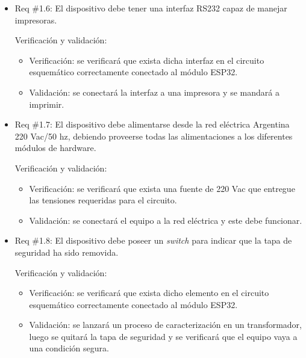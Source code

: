 \documentclass[11pt]{charter}
\begin{document}
\begin{itemize} 
\item Req \#1.6: El dispositivo debe tener una interfaz RS232 capaz de manejar impresoras.

Verificación y validación:

\begin{itemize}
\item Verificación: se verificará que exista dicha interfaz en el circuito esquemático correctamente conectado al módulo ESP32.
\item Validación: se conectará la interfaz a una impresora y se mandará a imprimir.
\end{itemize}

\end{itemize}

\begin{itemize} 
\item Req \#1.7: El dispositivo debe alimentarse desde la red eléctrica Argentina 220 Vac/50 hz, debiendo proveerse todas las alimentaciones a los diferentes módulos de hardware.

Verificación y validación:

\begin{itemize}
\item Verificación: se verificará que exista una fuente de 220 Vac que entregue las tensiones requeridas para el circuito.
\item Validación: se conectará el equipo a la red eléctrica y este debe funcionar. 
\end{itemize}

\end{itemize}

\begin{itemize} 
\item Req \#1.8: El dispositivo debe poseer un \textit{switch} para indicar que la tapa de seguridad ha sido removida.

Verificación y validación:

\begin{itemize}
\item Verificación: se verificará que exista dicho elemento en el circuito esquemático correctamente conectado al módulo ESP32.
\item Validación: se lanzará un proceso de caracterización en un transformador, luego se quitará la tapa de seguridad y se verificará que el equipo vaya a una condición segura.
\end{itemize}

\end{itemize}
\end{document}
